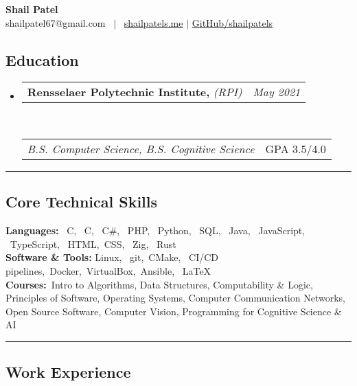 \documentclass[10pt,letterpaper]{article}
\makeatletter
\newcommand{\headerrow}[2]
{\begin{tabular*}{\linewidth}{l@{\extracolsep{\fill}}r}
	#1 &
	#2 \\
\end{tabular*}}
\newcommand{\CPP}
{C\nolinebreak[4]\hspace{-.05em}\raisebox{.22ex}{\footnotesize\bf ++}}
\makeatother
\begin{document}
\begin{center}
	{\LARGE \textbf{Shail Patel}}
	\vspace{0.2em}\\
    shailpatel67@gmail.com
	 \ $\mid$ \ \href{http://shailpatels.me/}{shailpatels.me} 
	 $\mid$ \href{https://github.com/shailpatels}{GitHub/shailpatels}\\
\end{center}

\subsection*{Education}
\begin{itemize}
	\parskip=0.1em
	\item 
	\headerrow
		{\textbf{Rensselaer Polytechnic Institute,} \emph{(RPI)}}
		{\emph{May 2021}}
	\\
	\headerrow
		{\emph{B.S. Computer Science, B.S. Cognitive Science}}
		{GPA 3.5/4.0}
\end{itemize}
\hrule
\vspace{-1em}
\subsection*{Core Technical Skills}
\textbf{Languages:} \  C, \ \CPP, \ C\#, \ PHP, \ Python, \ SQL, \ Java, \ JavaScript, \ TypeScript, \ HTML,\ CSS, \ Zig, \ Rust \vspace{0.5em}\\
\textbf{Software \& Tools:} Linux, \ git,\  CMake, \ CI/CD pipelines,\ Docker,\ VirtualBox,\ Ansible, \  \LaTeX \vspace{0.1in}\\
\textbf{Courses:}\, Intro to Algorithms, Data Structures, Computability \& Logic, Principles of Software, Operating Systems, Computer Communication Networks, Open Source Software, Computer Vision, Programming for Cognitive Science \& AI\\
\hrule

\subsection*{Work Experience}
\end{document}
